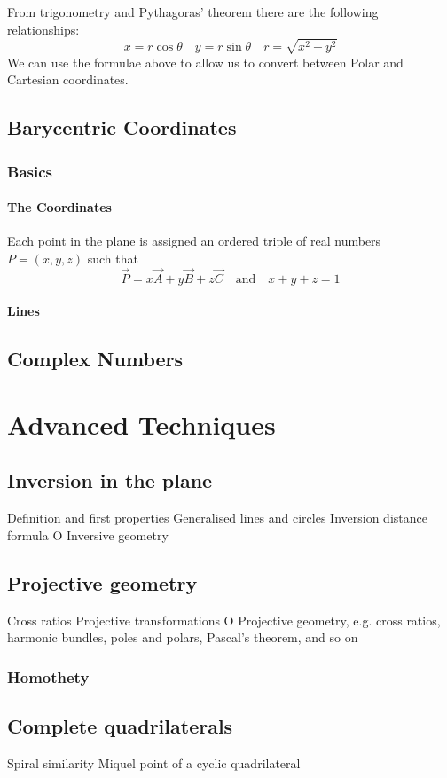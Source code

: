 From trigonometry and Pythagoras' theorem there are the following relationships:
\[ x = r\cos\theta \quad y = r\sin\theta \quad r = \sqrt{x^2+y^2} \]
We can use the formulae above to allow us to convert between Polar and Cartesian coordinates.

\section{Barycentric Coordinates}
\subsection{Basics}
\subsubsection{The Coordinates}
\begin{defn}{}{}
Each point in the plane is assigned an ordered triple of real numbers $P = (x, y, z)$ such that
\[ \vec{P} = x\vec{A} + y\vec{B} + z\vec{C} \quad \text{and} \quad x + y + z = 1 \]
\end{defn}

\subsubsection{Lines}
\pagebreak

\section{Complex Numbers}

\chapter{Advanced Techniques}
\section{Inversion in the plane}
Definition and first properties
Generalised lines and circles
Inversion distance formula
O Inversive geometry

\section{Projective geometry}
Cross ratios
Projective transformations
O Projective geometry, e.g. cross ratios, harmonic bundles, poles and polars,
Pascal's theorem, and so on

\subsection{Homothety}

\section{Complete quadrilaterals}
Spiral similarity
Miquel point of a cyclic quadrilateral

